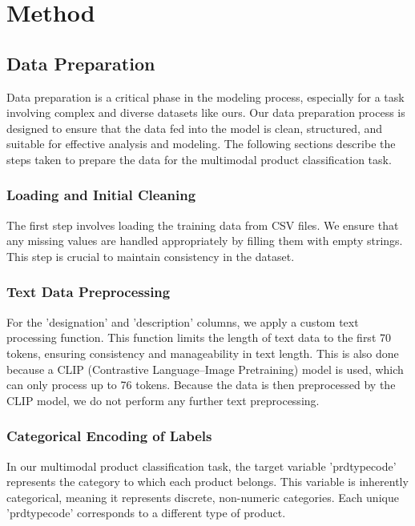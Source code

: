 \chapter{Method}
\label{sec:method}

\section{Data Preparation}
Data preparation is a critical phase in the modeling process, especially for a task involving complex and diverse datasets like ours. Our data preparation process is designed to ensure that the data fed into the model is clean, structured, and suitable for effective analysis and modeling. The following sections describe the steps taken to prepare the data for the multimodal product classification task.

\subsection{Loading and Initial Cleaning}

The first step involves loading the training data from CSV files.  We ensure that any missing values are handled appropriately by filling them with empty strings. This step is crucial to maintain consistency in the dataset.

\subsection{Text Data Preprocessing}

For the 'designation' and 'description' columns, we apply a custom text processing function. This function limits the length of text data to the first 70 tokens, ensuring consistency and manageability in text length. This is also done because a CLIP (Contrastive Language–Image Pretraining) model is used, which can only process up to 76 tokens. Because the data is then preprocessed by the CLIP model, we do not perform any further text preprocessing.

\subsection{Categorical Encoding of Labels}

In our multimodal product classification task, the target variable 'prdtypecode' represents the category to which each product belongs. This variable is inherently categorical, meaning it represents discrete, non-numeric categories. Each unique 'prdtypecode' corresponds to a different type of product.

